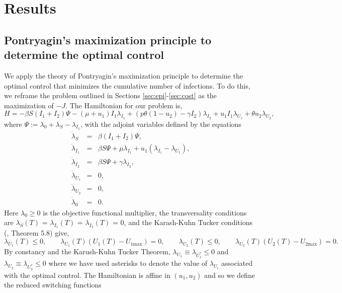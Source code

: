 \documentclass[pdflatex]{sn-jnl}
\theoremstyle{thmstyleone}%
\theoremstyle{thmstyletwo}%
\theoremstyle{thmstylethree}%
\begin{document}
\section{Results}

\subsection{Pontryagin's maximization principle to determine the optimal control}

We apply the theory of Pontryagin's maximization principle to determine the optimal control that minimizes the cumulative number of infections. To do this, we reframe the problem outlined in Sections \ref{sec:epi}-\ref{sec:cost} as the maximization of $-J$. The Hamiltonian for our problem is,
%
\begin{equation}
H= -\beta S (I_1 + I_2)\Psi -(\mu + u_1) I_1 \lambda_{I_1} + (p\theta (1-u_2) -\gamma I_2)\lambda_{I_2} +  u_1I_1\lambda_{U_1} + \theta u_2\lambda_{U_2}, 
\end{equation}
where $\Psi := \lambda_0 + \lambda_S - \lambda_{I_1}$, with the adjoint variables defined by the equations
%
\begin{eqnarray}
\dot{\lambda}_S & = & \beta (I_1+I_2)\Psi, \label{eq:ad1} \\
\dot{\lambda}_{I_1} & = &\beta S \Psi +  \mu \lambda_{I_1}  +u_1(\lambda_{I_1}-\lambda_{U_1}), \\
\dot{\lambda}_{I_2} & = & \beta S \Psi + \gamma \lambda_{I_2}, \\
\dot{\lambda}_{U_1} & = & 0, \\
\dot{\lambda}_{U_2} & = & 0, \label{eq:adend1} \\
\dot \lambda_0 &=&0. \label{eq:adend} 
\end{eqnarray}
%
Here $\lambda_0 \geq 0$ is the objective functional multiplier, the transversality conditions are $\lambda_S(T)$ = $\lambda_{I_1}(T)$ = $\lambda_{I_2}(T)$ = 0, and 
the Karash-Kuhn Tucker conditions (\citealt{kkt}, Theorem 5.8) give,
%
\[ \lambda_{U_1}(T) \leq 0, \quad \quad  \lambda_{U_1}(T)(U_1(T) - U_{1\text{max}})=0, \quad \quad \lambda_{U_2}(T) \leq 0, \quad \quad  \lambda_{U_2}(T)(U_2(T) - U_{2\text{max}})=0. \]
%
By constancy and the Karush-Kuhn Tucker Theorem, $\lambda_{U_1} \equiv \lambda_{U^*_1}\leq 0$ and $\lambda_{U_2} \equiv \lambda_{U^*_2} \leq 0$ where we have used asterisks to denote the value of $\lambda_{U_i}$ associated with the optimal control. 
%
The Hamiltonian is affine in $(u_1, u_2)$ and so we define the reduced switching functions
\end{document}
